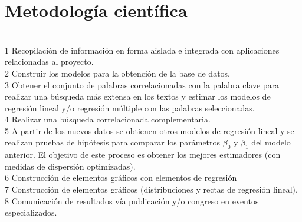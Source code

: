 \section {Metodología científica}
\ \\
1 Recopilación de información en forma aislada e integrada con aplicaciones relacionadas al proyecto.\\
2 Construir los modelos para la obtención de la base de datos.\\
3 Obtener el conjunto de palabras correlacionadas con la palabra clave para realizar una búsqueda más extensa en los textos y estimar los modelos de regresión lineal y/o regresión múltiple con las palabras seleccionadas.\\
4 Realizar una búsqueda correlacionada complementaria.\\
5 A partir de los nuevos datos se obtienen otros modelos de regresión lineal y se realizan pruebas de hipótesis para comparar los parámetros $\beta_0$ y $\beta_1$ del modelo anterior. El objetivo de este proceso es obtener los mejores estimadores (con medidas de dispersión optimizadas).\\
6 Construcción de elementos gráficos con elementos de regresión\\
7 Construcción de elementos gráficos (distribuciones y rectas de regresión lineal).\\
8 Comunicación de resultados vía publicación y/o congreso en eventos especializados.
